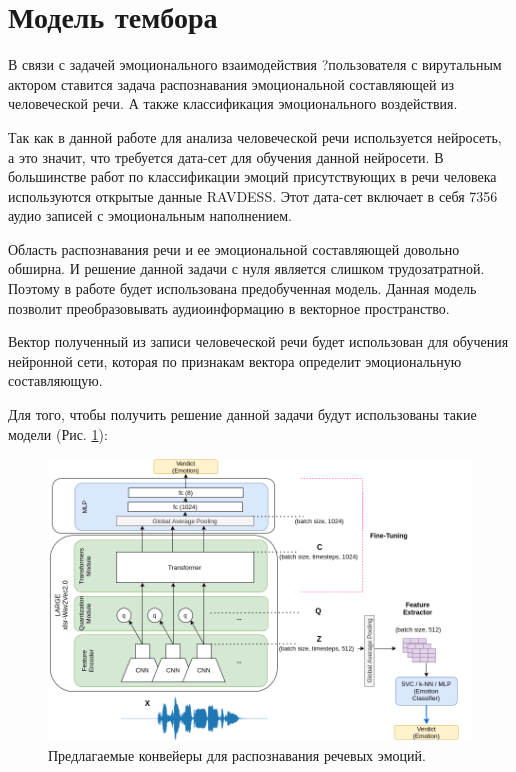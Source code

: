 
\section{Модель тембора}

В связи с задачей эмоционального взаимодействия ?пользователя с вирутальным актором
ставится задача распознавания эмоциональной составляющей из человеческой речи. А также
классификация эмоционального воздействия.

Так как в данной работе для анализа человеческой речи используется нейросеть, а это значит,
что требуется дата-сет для обучения данной нейросети.
В большинстве работ по классификации эмоций присутствующих в речи человека используются
открытые данные RAVDESS. Этот дата-сет включает в себя 7356 аудио записей с эмоциональным наполнением.

Область распознавания речи и ее эмоциональной составляющей довольно обширна. И решение данной задачи с нуля
является слишком трудозатратной. Поэтому в работе будет использована предобученная модель.
Данная модель позволит преобразовывать аудиоинформацию в векторное пространство.

Вектор полученный из записи человеческой речи будет использован для обучения нейронной сети,
которая по признакам вектора определит эмоциональную составляющую.

Для того, чтобы получить решение данной задачи будут использованы такие модели (Рис. \ref{pic:normpic}):


\begin{figure}[h]
\includegraphics[width=0.75\columnwidth]{./img/normpic.png}
\centering
\caption{Предлагаемые конвейеры для распознавания речевых эмоций.}
\label{pic:normpic}
\end{figure}


